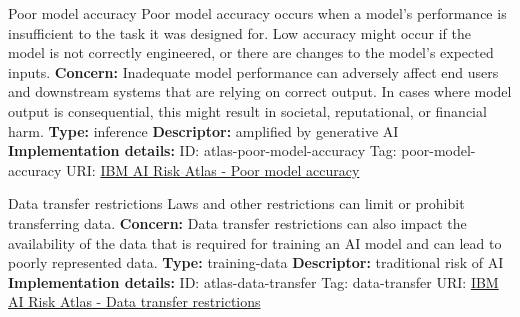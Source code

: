 \documentclass[a4paper,12pt]{article}
\begin{document}
\begin{definitionbox}{Poor model accuracy}
Poor model accuracy occurs when a model's performance is insufficient to the task it was designed for. Low accuracy might occur if the model is not correctly engineered, or there are changes to the model's expected inputs.\newline\newline
\textbf{Concern: }Inadequate model performance can adversely affect end users and downstream systems that are relying on correct output. In cases where model output is consequential, this might result in societal, reputational, or financial harm.\newline\newline
\textbf{Type: }inference\newline
\textbf{Descriptor: }amplified by generative AI \newline\newline
\textbf{Implementation details: } \newline
ID: atlas-poor-model-accuracy \newline
Tag: poor-model-accuracy \newline
URI:  \href{https://www.ibm.com/docs/en/watsonx/saas?topic=SSYOK8/wsj/ai-risk-atlas/poor-model-accuracy.html}{IBM AI Risk Atlas - Poor model accuracy}\newline
\end{definitionbox}
\begin{definitionbox}{Data transfer restrictions}
Laws and other restrictions can limit or prohibit transferring data.\newline\newline
\textbf{Concern: }Data transfer restrictions can also impact the availability of the data that is required for training an AI model and can lead to poorly represented data.\newline\newline
\textbf{Type: }training-data\newline
\textbf{Descriptor: }traditional risk of AI \newline\newline
\textbf{Implementation details: } \newline
ID: atlas-data-transfer \newline
Tag: data-transfer \newline
URI:  \href{https://www.ibm.com/docs/en/watsonx/saas?topic=SSYOK8/wsj/ai-risk-atlas/data-transfer.html}{IBM AI Risk Atlas - Data transfer restrictions}\newline
\end{definitionbox}
\end{document}
